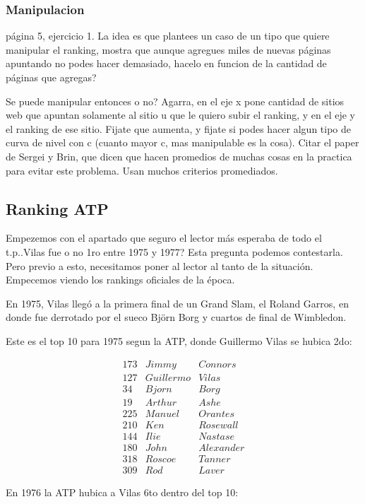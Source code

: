 \subsubsection{Manipulacion}
página 5, ejercicio 1. La idea es que plantees un caso de un tipo que quiere manipular el ranking, mostra que aunque agregues miles de nuevas páginas apuntando no podes hacer demasiado, hacelo en funcion de la cantidad de páginas que agregas?

Se puede manipular entonces o no? Agarra, en el eje x pone cantidad de sitios web que apuntan solamente al sitio u que le quiero subir el ranking, y en el eje y el ranking de ese sitio. Fijate que aumenta, y fijate si podes hacer algun tipo de curva de nivel con c (cuanto mayor c, mas manipulable es la cosa). Citar el paper de Sergei y Brin, que dicen que hacen promedios de muchas cosas en la practica para evitar este problema. Usan muchos criterios promediados.

\subsection{Ranking ATP}

Empezemos con el apartado que seguro el lector más esperaba de todo el t.p..Vilas fue o no 1ro entre 1975 y 1977? Esta pregunta podemos contestarla. Pero previo a esto, necesitamos poner al lector al tanto de la situación. Empecemos viendo los rankings oficiales de la época.


En 1975, Vilas llegó a la primera final de un Grand Slam, el Roland Garros, en donde fue derrotado por el sueco Björn Borg
y cuartos de final de Wimbledon.


Este es el top 10 para 1975 segun la ATP, donde Guillermo Vilas se hubica 2do:

\begin{eqnarray*}
173 & Jimmy & Connors \\
127 & Guillermo & Vilas \\
34 & Bjorn & Borg \\
19 & Arthur & Ashe \\
225 & Manuel & Orantes \\
210 & Ken & Rosewall \\
144 & Ilie & Nastase \\
180 & John & Alexander \\
318 & Roscoe & Tanner \\
309 & Rod & Laver 
\end{eqnarray*}

En 1976 la ATP hubica a Vilas 6to dentro del top 10:

